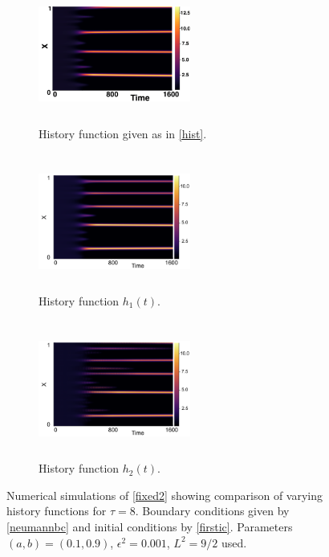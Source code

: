 \begin{figure}[H]
    \centering
    \begin{subfigure}[t]{0.32\textwidth}
        \centering
        \includegraphics[width=5cm,height=4.5cm]{ic28.png}
        \caption{History function given as in \eqref{hist}.}
        \label{}
    \end{subfigure}
    \hfill
    \begin{subfigure}[t]{0.32\textwidth}
        \centering
        \includegraphics[width=5cm,height=4.5cm]{h18.png}
        \caption{History function $h_1(t)$.}
        \label{}
    \end{subfigure}
    \hfill
    \begin{subfigure}[t]{0.32\textwidth}
        \centering
        \includegraphics[width=5cm,height=4.5cm]{h28.png}
        \caption{History function $h_2(t)$.}
        \label{}
    \end{subfigure}
    \caption{Numerical simulations of \eqref{fixed2} showing comparison of varying history functions for $\tau=8$. Boundary conditions given by \eqref{neumannbc} and initial conditions by \eqref{firstic}. Parameters $(a,b)=(0.1,0.9)$, $\epsilon^2=0.001$, $L^2=9/2$ used.}
    \label{fig:temp8}
\end{figure}
